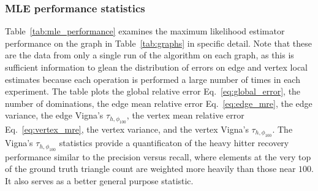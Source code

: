 \documentclass[10]{article}
\begin{document}
\subsubsection{MLE performance statistics}

Table~\ref{tab:mle_performance} examines the maximum likelihood estimator performance on the graph in Table~\ref{tab:graphs} in specific detail. 
Note that these are the data from only a single run of the algorithm on each graph, as this is sufficient information to glean the distribution of errors on edge and vertex local estimates because each operation is performed a large number of times in each experiment.
The table plots the global relative error Eq.~\eqref{eq:global_error}, the number of dominations, the edge mean relative error Eq.~\eqref{eq:edge_mre}, the edge variance, the edge Vigna's $\tau_{h, \phi_{100}}$, the vertex mean relative error Eq.~\eqref{eq:vertex_mre}, the vertex variance, and the vertex Vigna's $\tau_{h, \phi_{100}}$.
The Vigna's $\tau_{h, \phi_{100}}$ statistics provide a quantificaton of the heavy hitter recovery performance similar to the precision versus recall, where elements at the very top of the ground truth triangle count are weighted more heavily than those near $100$.
It also serves as a better general purpose statistic. 
\end{document}
